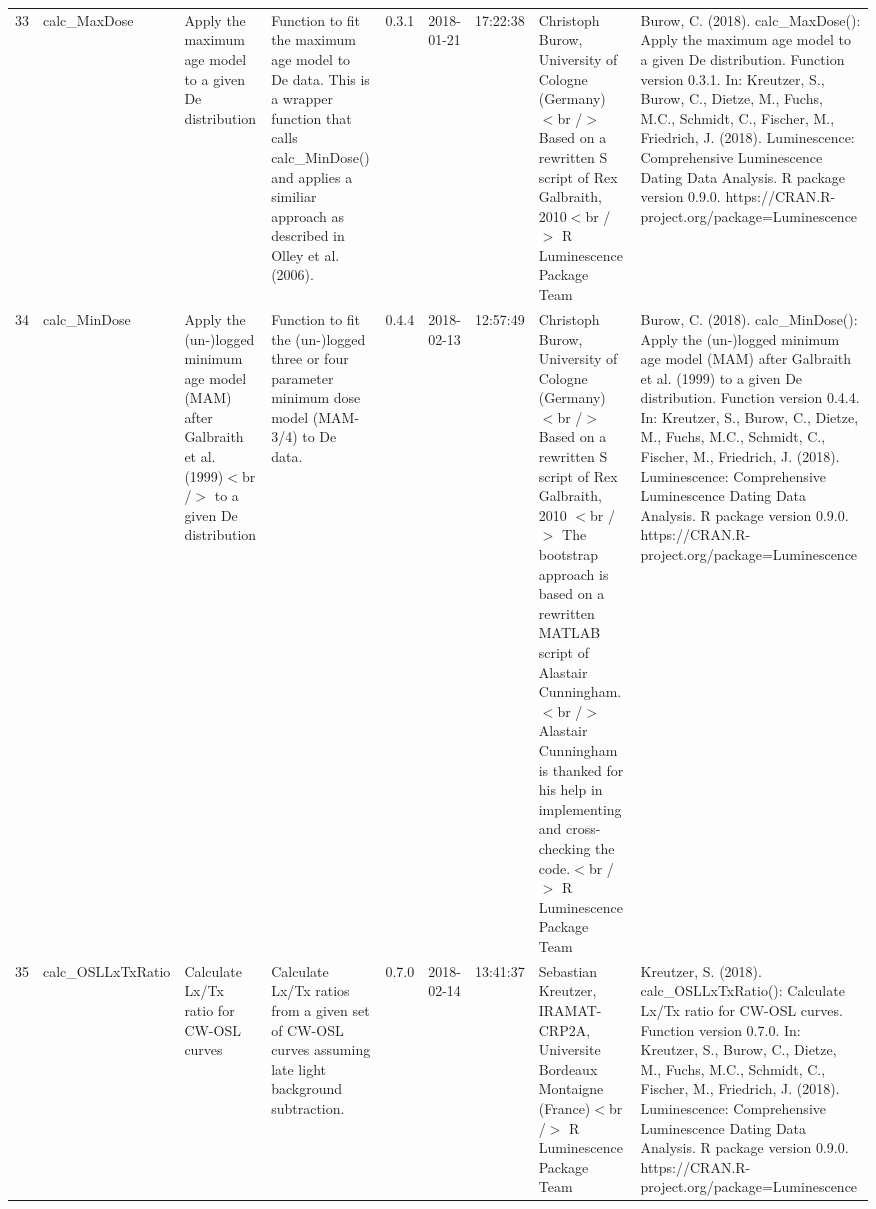 \begin{table}[ht]
\begin{tabular}{rllllllll}
 \\ 
  33 & calc\_MaxDose & Apply the maximum age model to a given De distribution & Function to fit the maximum age model to De data. This is a wrapper function that calls calc\_MinDose() and applies a similiar approach as described in Olley et al. (2006). & 0.3.1 & 2018-01-21 & 17:22:38
 & Christoph Burow, University of Cologne (Germany)  $<$br /$>$ Based on a rewritten S script of Rex Galbraith, 2010$<$br /$>$  R Luminescence Package Team & Burow, C. (2018). calc\_MaxDose(): Apply the maximum age model to a given De distribution. Function version 0.3.1. In: Kreutzer, S., Burow, C., Dietze, M., Fuchs, M.C., Schmidt, C., Fischer, M., Friedrich, J. (2018). Luminescence: Comprehensive Luminescence Dating Data Analysis. R package version 0.9.0. https://CRAN.R-project.org/package=Luminescence
 \\ 
  34 & calc\_MinDose & Apply the (un-)logged minimum age model (MAM) after Galbraith et al. (1999)$<$br /$>$ to a given De distribution & Function to fit the (un-)logged three or four parameter minimum dose model (MAM-3/4) to De data. & 0.4.4 & 2018-02-13 & 12:57:49
 & Christoph Burow, University of Cologne (Germany)  $<$br /$>$ Based on a rewritten S script of Rex Galbraith, 2010  $<$br /$>$ The bootstrap approach is based on a rewritten MATLAB script of Alastair Cunningham.  $<$br /$>$ Alastair Cunningham is thanked for his help in implementing and cross-checking the code.$<$br /$>$  R Luminescence Package Team & Burow, C. (2018). calc\_MinDose(): Apply the (un-)logged minimum age model (MAM) after Galbraith et al. (1999) to a given De distribution. Function version 0.4.4. In: Kreutzer, S., Burow, C., Dietze, M., Fuchs, M.C., Schmidt, C., Fischer, M., Friedrich, J. (2018). Luminescence: Comprehensive Luminescence Dating Data Analysis. R package version 0.9.0. https://CRAN.R-project.org/package=Luminescence
 \\ 
  35 & calc\_OSLLxTxRatio & Calculate Lx/Tx ratio for CW-OSL curves & Calculate Lx/Tx ratios from a given set of CW-OSL curves assuming late light background subtraction. & 0.7.0 & 2018-02-14 & 13:41:37
 & Sebastian Kreutzer, IRAMAT-CRP2A, Universite Bordeaux Montaigne (France)$<$br /$>$  R Luminescence Package Team & Kreutzer, S. (2018). calc\_OSLLxTxRatio(): Calculate Lx/Tx ratio for CW-OSL curves. Function version 0.7.0. In: Kreutzer, S., Burow, C., Dietze, M., Fuchs, M.C., Schmidt, C., Fischer, M., Friedrich, J. (2018). Luminescence: Comprehensive Luminescence Dating Data Analysis. R package version 0.9.0. https://CRAN.R-project.org/package=Luminescence

\end{tabular}
\end{table}
